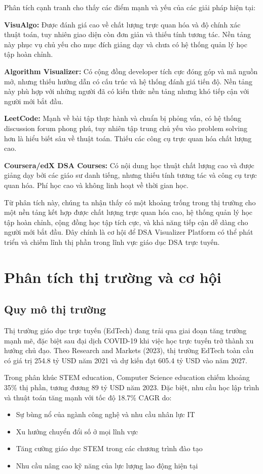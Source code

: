Phân tích cạnh tranh cho thấy các điểm mạnh và yếu của các giải pháp hiện tại:

\textbf{VisuAlgo:} Được đánh giá cao về chất lượng trực quan hóa và độ chính xác thuật toán, tuy nhiên giao diện còn đơn giản và thiếu tính tương tác. Nền tảng này phục vụ chủ yếu cho mục đích giảng dạy và chưa có hệ thống quản lý học tập hoàn chỉnh.

\textbf{Algorithm Visualizer:} Có cộng đồng developer tích cực đóng góp và mã nguồn mở, nhưng thiếu hướng dẫn có cấu trúc và hệ thống đánh giá tiến độ. Nền tảng này phù hợp với những người đã có kiến thức nền tảng nhưng khó tiếp cận với người mới bắt đầu.

\textbf{LeetCode:} Mạnh về bài tập thực hành và chuẩn bị phỏng vấn, có hệ thống discussion forum phong phú, tuy nhiên tập trung chủ yếu vào problem solving hơn là hiểu biết sâu về thuật toán. Thiếu các công cụ trực quan hóa chất lượng cao.

\textbf{Coursera/edX DSA Courses:} Có nội dung học thuật chất lượng cao và được giảng dạy bởi các giáo sư danh tiếng, nhưng thiếu tính tương tác và công cụ trực quan hóa. Phí học cao và không linh hoạt về thời gian học.

Từ phân tích này, chúng ta nhận thấy có một khoảng trống trong thị trường cho một nền tảng kết hợp được chất lượng trực quan hóa cao, hệ thống quản lý học tập hoàn chỉnh, cộng đồng học tập tích cực, và khả năng tiếp cận dễ dàng cho người mới bắt đầu. Đây chính là cơ hội để DSA Visualizer Platform có thể phát triển và chiếm lĩnh thị phần trong lĩnh vực giáo dục DSA trực tuyến.

\section{Phân tích thị trường và cơ hội}
\label{sec:market-opportunity}

\subsection{Quy mô thị trường}
\label{subsec:market-size}

Thị trường giáo dục trực tuyến (EdTech) đang trải qua giai đoạn tăng trưởng mạnh mẽ, đặc biệt sau đại dịch COVID-19 khi việc học trực tuyến trở thành xu hướng chủ đạo. Theo Research and Markets (2023), thị trường EdTech toàn cầu có giá trị 254.8 tỷ USD năm 2021 và dự kiến đạt 605.4 tỷ USD vào năm 2027.

Trong phân khúc STEM education, Computer Science education chiếm khoảng 35\% thị phần, tương đương 89 tỷ USD năm 2023. Đặc biệt, nhu cầu học lập trình và thuật toán tăng mạnh với tốc độ 18.7\% CAGR do:
\begin{itemize}
\item Sự bùng nổ của ngành công nghệ và nhu cầu nhân lực IT
\item Xu hướng chuyển đổi số ở mọi lĩnh vực
\item Tăng cường giáo dục STEM trong các chương trình đào tạo
\item Nhu cầu nâng cao kỹ năng của lực lượng lao động hiện tại
\end{itemize}

